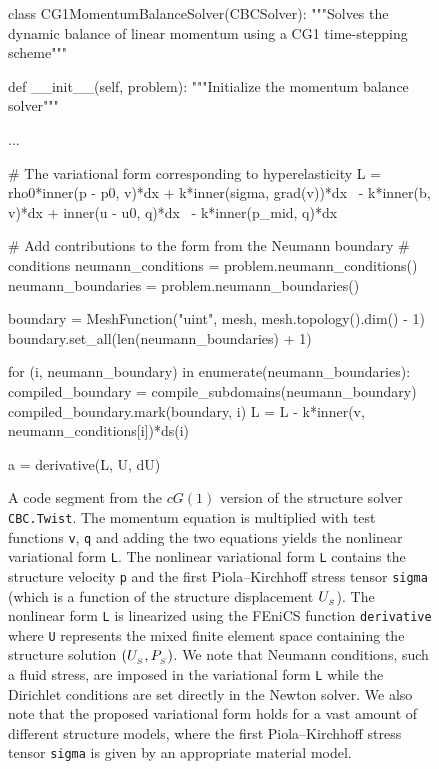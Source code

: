 \begin{figure}
\label{selim:fig:structuresolver}
\caption{A code segment from the $cG(1)$ version of the structure
  solver \texttt{CBC.Twist}.  The momentum equation is multiplied with
  test functions \texttt{v}, \texttt{q} and adding the two equations
  yields the nonlinear variational form \texttt{L}. The nonlinear
  variational form \texttt{L} contains the structure velocity
  \texttt{p} and the first Piola--Kirchhoff stress tensor
  \texttt{sigma} (which is a function of the structure
  displacement $U_{_{S}}$).  The nonlinear form \texttt{L} is
  linearized using the FEniCS function \texttt{derivative} where
  \texttt{U} represents the mixed finite element space containing the
  structure solution $(U_{_{S}}, P_{_{S}})$.  We note that Neumann
  conditions, such a fluid stress, are imposed in the variational form
  \texttt{L} while the Dirichlet conditions are set directly in the
  Newton solver. We also note that the proposed variational form holds
  for a vast amount of different structure models, where the first
  Piola--Kirchhoff stress tensor \texttt{sigma} is given by an
  appropriate material model.  }
\begin{python}
class CG1MomentumBalanceSolver(CBCSolver):
    """Solves the dynamic balance of linear momentum using a CG1
    time-stepping scheme"""

    def __init__(self, problem):
        """Initialize the momentum balance solver"""

        ...

        # The variational form corresponding to hyperelasticity
        L = rho0*inner(p - p0, v)*dx + k*inner(sigma, grad(v))*dx \
          - k*inner(b, v)*dx + inner(u - u0, q)*dx \
          - k*inner(p_mid, q)*dx

        # Add contributions to the form from the Neumann boundary
        # conditions
        neumann_conditions = problem.neumann_conditions()
        neumann_boundaries = problem.neumann_boundaries()

        boundary = MeshFunction("uint", mesh, mesh.topology().dim() - 1)
        boundary.set_all(len(neumann_boundaries) + 1)

        for (i, neumann_boundary) in enumerate(neumann_boundaries):
            compiled_boundary = compile_subdomains(neumann_boundary)
            compiled_boundary.mark(boundary, i)
            L = L - k*inner(v, neumann_conditions[i])*ds(i)

        a = derivative(L, U, dU)
\end{python}
\end{figure}

